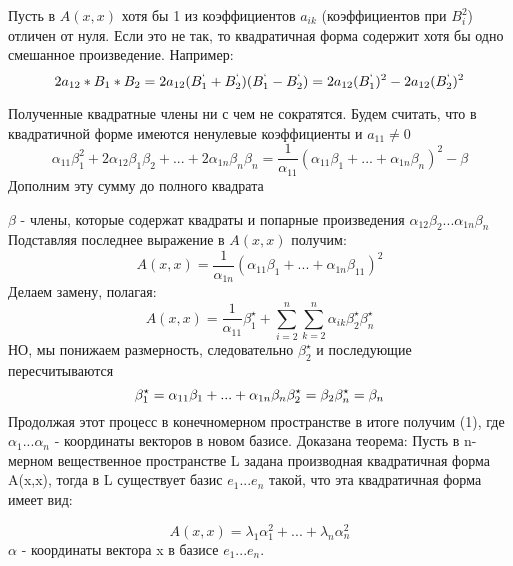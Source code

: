 \documentclass{article}
\begin{document}
Пусть в \(A(x,x)\) хотя бы 1 из коэффициентов \(a_{ik}\) (коэффициентов при \(B_{i}^{2}\)) отличен от нуля. \newline
Если это не так, то квадратичная форма содержит хотя бы одно смешанное произведение. 
Например:\newline
\[2a_{12}*B_{1}*B_{2} = 2a_{12}(B_{1}^{`}+B_{2}^{`})(B_{1}^{`}-B_{2}^{`})=2a_{12}(B_{1}^{`})^2-2a_{12}(B_{2}^{`})^2\]\newline

Полученные квадратные члены ни с чем не сократятся. \newline
Будем считать, что в квадратичной форме имеются ненулевые коэффициенты и \(a_{11} \neq 0\)\newline
\[\alpha_{11}\beta_1^2+2\alpha_{12}\beta_{1}\beta_{2}+...+2\alpha_{1n}\beta_{n}\beta_{n}=\frac{1}{\alpha_{11}}(\alpha_{11}\beta_{1}+ ... + \alpha_{1n}\beta_{n})^2 - \beta\]\newline
Дополним эту сумму до полного квадрата\newline

 \(\beta \) - члены, которые содержат квадраты и попарные произведения \(\alpha_{12}\beta_{2} ... \alpha_{1n}\beta_{n}\)\newline
 Подставляя последнее выражение в \(A(x,x)\) получим:\newline
 \[A(x,x) = \frac{1}{\alpha_{1n}}(\alpha_{11}\beta_{1} + ... + \alpha_{1n} \beta_{11})^2\]
 Делаем замену, полагая:\newline
 \[A(x,x) = \frac{1}{\alpha_{11}}\beta_{1}^{\star}+\sum_{i=2}^{n}\sum_{k=2}^{n}\alpha_{ik}\beta_2^{\star}\beta_n^{\star}\]\newline
 НО, мы понижаем размерность, следовательно \(\beta_{2}^{\star}\) и последующие пересчитываются\newline
 \[\beta_1^{\star} = \alpha_{11}\beta_{1} + ... + \alpha_{1n}\beta_{n}
\\\beta_2^{\star} = \beta_2
\\\beta_n^{\star} = \beta_n\]
Продолжая этот процесс в конечномерном пространстве в итоге получим (1), где \(\alpha_{1}...\alpha_{n}\) - координаты векторов в новом базисе.\newline
Доказана теорема:\newline
Пусть в n-мерном вещественное пространстве  L задана производная квадратичная форма A(x,x), тогда в L существует базис \(e_{1}...e_{n}\) такой, что эта квадратичная форма имеет вид:\newline

 \[A(x,x) = \lambda_{1}\alpha_1^2 + ... + \lambda_{n}\alpha_n^2\]
\(\alpha\) - координаты вектора x в базисе \(e_{1}...e_{n}\).\newline
\end{document}
